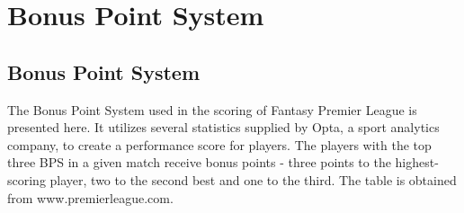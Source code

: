 

\appendix

\renewcommand{\thechapter}{\Alph{chapter}}


\chapter{Bonus Point System}
\section{Bonus Point System}\label{A1_BPS}

The Bonus Point System used in the scoring of Fantasy Premier League is presented here. It utilizes several statistics supplied by Opta, a sport analytics company, to create a performance score for players. The players with the top three BPS in a given match receive bonus points - three points to the highest-scoring player, two to the second best and one to the third. The table is obtained from www.premierleague.com. 

